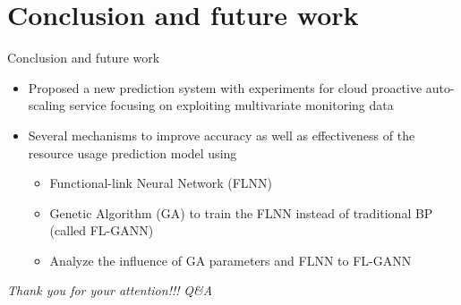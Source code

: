 \documentclass{beamer}
\begin{document}
\section{Conclusion and future work}
\begin{frame}{Conclusion and future work}
	\begin{itemize}
		\item {
		Proposed a new prediction system with experiments for cloud proactive auto-scaling service focusing on exploiting multivariate monitoring data
		}
		\item{
			Several mechanisms to improve accuracy as well as effectiveness of the resource usage prediction model using
			\begin{itemize}
			\item {
				Functional-link Neural Network (FLNN)
			}
			\item {
				Genetic Algorithm (GA) to train the FLNN instead of traditional BP (called FL-GANN)
			}
			\item{
				Analyze the influence of GA parameters and FLNN to FL-GANN
			}
		\end{itemize}
		}
	\end{itemize}
\end{frame}

\begin{frame}{}
	
		\centering \Huge
		\emph{Thank you for your attention!!!}
		\emph{Q\&A}
			
		
\end{frame}
%
%
\end{document}
